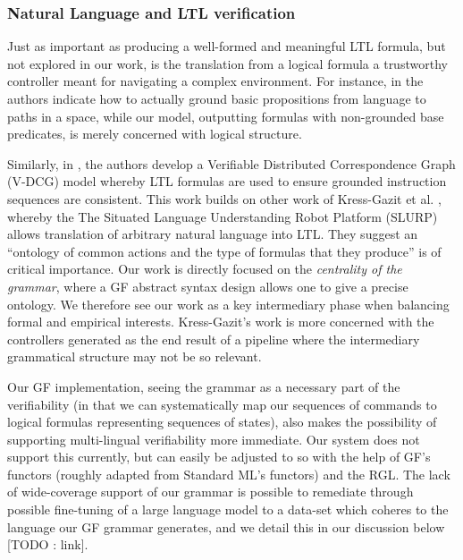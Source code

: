 \documentclass[a4paper, 11pt]{article}
\begin{document}

\subsubsection{Natural Language and LTL verification}


Just as important as producing a
well-formed and meaningful LTL formula, but not explored in our work, is the
translation from a logical formula a trustworthy controller meant for navigating
a complex environment. For instance, in \cite{plaku2016motion} the authors
indicate how to actually ground basic propositions from language to paths in a
space, while our model, outputting formulas with non-grounded base predicates,
is merely concerned with logical structure.

Similarly, in \cite{7759412}, the authors develop a Verifiable Distributed
Correspondence Graph (V-DCG) model whereby LTL formulas are used to ensure
grounded instruction sequences are consistent. This work builds on other work of
Kress-Gazit et al. \cite{provCorrectNatControl}, whereby the The Situated
Language Understanding Robot Platform (SLURP) allows translation of arbitrary
natural language into LTL. They suggest an ``ontology of common actions and the
type of formulas that they produce'' is of critical importance. Our work is
directly focused on the \emph{centrality of the grammar}, where a GF abstract
syntax design allows one to give a precise ontology. We therefore see our work as
a key intermediary phase when balancing formal and empirical interests.
Kress-Gazit's work is more concerned with the controllers generated as the end
result of a pipeline where the intermediary grammatical structure may not be so
relevant.

Our GF implementation, seeing the grammar as a necessary part of the
verifiability (in that we can systematically map our sequences of commands to
logical formulas representing sequences of states), also makes the possibility of
supporting multi-lingual verifiability more immediate. Our system does not
support this currently, but can easily be adjusted to so with the help of GF's
functors (roughly adapted from Standard ML's functors) and the RGL. The lack of wide-coverage
support of our grammar is possible to remediate through possible fine-tuning of
a large language model to a data-set which coheres to the language our GF
grammar generates, and we detail this in our discussion below [TODO : link].
\end{document}

